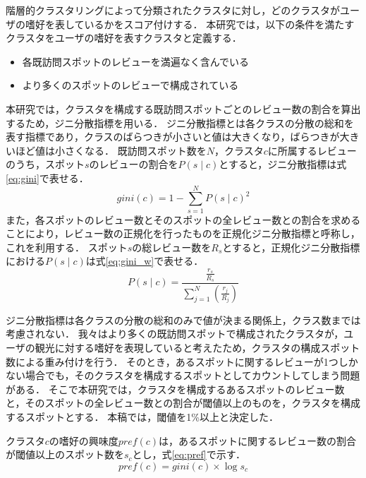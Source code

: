 \documentclass{deimj}
\begin{document}
階層的クラスタリングによって分類されたクラスタに対し，どのクラスタがユーザの嗜好を表しているかをスコア付けする．
本研究では，以下の条件を満たすクラスタをユーザの嗜好を表すクラスタと定義する．
\begin{itemize}
 \item 各既訪問スポットのレビューを満遍なく含んでいる
 \item より多くのスポットのレビューで構成されている
\end{itemize}

本研究では，クラスタを構成する既訪問スポットごとのレビュー数の割合を算出するため，ジニ分散指標を用いる．
ジニ分散指標とは各クラスの分散の総和を表す指標であり，クラスのばらつきが小さいと値は大きくなり，ばらつきが大きいほど値は小さくなる．
既訪問スポット数を$N$，クラスタ$c$に所属するレビューのうち，スポット$s$のレビューの割合を$P(s \mid c)$とすると，ジニ分散指標は式\ref{eq:gini}で表せる．
\begin{equation}
    gini(c)=1-\sum ^{N}_{s=1} P(s \mid c) ^{2}
    \label{eq:gini}
\end{equation}
また，各スポットのレビュー数とそのスポットの全レビュー数との割合を求めることにより，レビュー数の正規化を行ったものを正規化ジニ分散指標と呼称し，これを利用する．
スポット$s$の総レビュー数を$R_s$とすると，正規化ジニ分散指標における$P(s \mid c)$は式\ref{eq:gini_w}で表せる．
\begin{equation}
    P(s \mid c)=\frac {\frac{r_s}{R_s}}{\sum ^{N}_{j=1}\left( \frac {r_j}{R_j}\right)}
    \label{eq:gini_w}
\end{equation}

ジニ分散指標は各クラスの分散の総和のみで値が決まる関係上，クラス数までは考慮されない．
我々はより多くの既訪問スポットで構成されたクラスタが，ユーザの観光に対する嗜好を表現していると考えたため，クラスタの構成スポット数による重み付けを行う．
そのとき，あるスポットに関するレビューが1つしかない場合でも，そのクラスタを構成するスポットとしてカウントしてしまう問題がある．
そこで本研究では，クラスタを構成するあるスポットのレビュー数と，そのスポットの全レビュー数との割合が閾値以上のものを，クラスタを構成するスポットとする．
本稿では，閾値を1\%以上と決定した．

クラスタ$c$の嗜好の興味度$pref(c)$は，あるスポットに関するレビュー数の割合が閾値以上のスポット数を$s_c$とし，式\ref{eq:pref}で示す．
\begin{equation}
    pref(c)=gini(c) \times\log s_c
    \label{eq:pref}
\end{equation}
\end{document}
